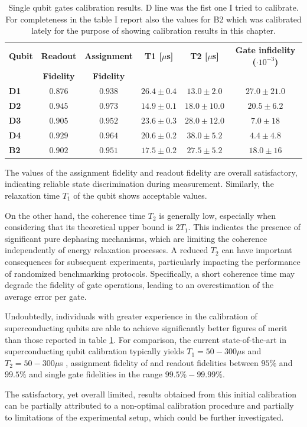 \begin{table}[h]
    \centering
    \begin{tabular}{lccccc}
    \toprule
    \textbf{Qubit} & \multicolumn{1}{c}{\textbf{Readout}} & \multicolumn{1}{c}{\textbf{Assignment}} & \textbf{T1 [$\mu$s]} & \textbf{T2 [$\mu$s]} & \textbf{Gate infidelity ($\cdot 10^{-3}$)} \\
    \textbf{} & \textbf{Fidelity} & \textbf{Fidelity} & & & \\
    \midrule
    \textbf{D1} & $0.876$ & $0.938$ & $26.4 \pm 0.4$ & $13.0 \pm 2.0$ & $27.0 \pm 21.0$ \\
    \textbf{D2} & $0.945$ & $0.973$ & $14.9 \pm 0.1$ & $18.0 \pm 10.0$ & $20.5 \pm 6.2$ \\
    \textbf{D3} & $0.905$ & $0.952$ & $23.6 \pm 0.3$ & $28.0 \pm 12.0$ & $7.0 \pm 18$ \\
    \textbf{D4} & $0.929$ & $0.964$ & $20.6 \pm 0.2$ & $38.0 \pm 5.2$ & $4.4 \pm 4.8$ \\
    \textbf{B2} & $0.902$ & $0.951$ & $17.5 \pm 0.2$ & $27.5 \pm 5.2$ & $18.0 \pm 16$ \\
    \bottomrule
    \end{tabular}
    \caption{Single qubit gates calibration results. D line was the fist one I tried to calibrate.\\
    For completeness in the table I report also the values for B2 which was calibrated lately for the purpose of showing calibration results in this chapter.}
    \label{tab:cal_results}
\end{table}

The values of the assignment fidelity and readout fidelity are overall satisfactory, indicating reliable state discrimination during measurement. 
Similarly, the relaxation time $T_1$ of the qubit shows acceptable values.

On the other hand, the coherence time $T_2$ is generally low, especially when considering that its theoretical upper bound is $2T_1$. 
This indicates the presence of significant pure dephasing mechanisms, which are limiting the coherence independently of energy relaxation processes. 
A reduced $T_2$ can have important consequences for subsequent experiments, particularly impacting the performance of randomized benchmarking protocols. 
Specifically, a short coherence time may degrade the fidelity of gate operations, leading to an overestimation of the average error per gate.

Undoubtedly, individuals with greater experience in the calibration of superconducting qubits are able to achieve significantly better figures of merit than those reported in table \ref{tab:cal_results}.
For comparison, the current state-of-the-art in superconducting qubit calibration typically yields $T_1= 50-300 \mu$s \cite{Place2021-kc} and $T_2= 50-300 \mu$s \cite{Place2021-kc}, assignment fidelity of  and readout fidelities between $95\%$ and $99.5\%$ \cite{krantz_quantum_2019} and single gate fidelities in the range $99.5\% - 99.99\%$.

The satisfactory, yet overall limited, results obtained from this initial calibration can be partially attributed to a non-optimal calibration procedure and partially to limitations of the experimental setup, which could be further investigated.